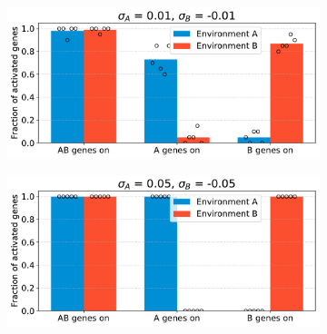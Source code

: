 \begin{figure}[H]
\begin{subfigure}[t]{0.49\textwidth}
\includegraphics[width=\textwidth]{alife/img/mean_activation_sigma-0.01.pdf}
\label{subfig:alife:param_sigma_1}
\end{subfigure}
\begin{subfigure}[t]{0.49\textwidth}
\includegraphics[width=\textwidth]{alife/img/mean_activation_sigma-0.05.pdf}
\label{subfig:alife:param_sigma_2}
\end{subfigure}


\end{figure}
